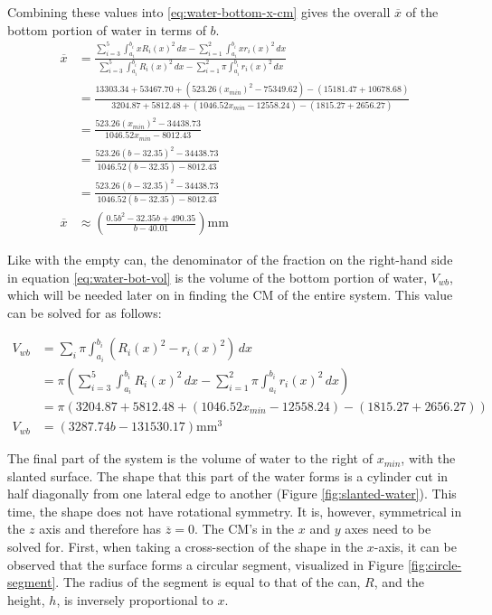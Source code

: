 \documentclass[11pt]{article}
\begin{document}
    Combining these values into \eqref{eq:water-bottom-x-cm} gives the overall $\overline{x}$ of the bottom portion of water in terms of $b$.
    {\footnotesize\begin{align*}
        \overline{x} &= \frac{\sum_{i=3}^5 \int_{a_i}^{b_i} x R_i(x)^2 \, dx - \sum_{i=1}^2 \int_{a_i}^{b_i} x r_i(x)^2 \, dx}{\sum_{i=3}^5 \int_{a_i}^{b_i} R_i(x)^2 \, dx - \sum_{i=1}^2 \pi \int_{a_i}^{b_i} r_i(x)^2 \, dx} \\
        &= \frac{13303.34 + 53467.70 + (523.26 (x_{min})^2 - 75349.62) - (15181.47 + 10678.68)}{3204.87 + 5812.48 + (1046.52x_{min} - 12558.24) - (1815.27 + 2656.27)} \\
        &= \frac{523.26 (x_{min})^2 - 34438.73}{1046.52x_{min} - 8012.43} \\
        &= \frac{523.26 (b - 32.35)^2 - 34438.73}{1046.52(b - 32.35) - 8012.43} \\
        &= \frac{523.26 (b - 32.35)^2 - 34438.73}{1046.52(b - 32.35) - 8012.43} \\
        \overline{x} &\approx \left( \frac{0.5b^2 - 32.35b + 490.35}{b - 40.01} \right) \mathrm{mm}
    \end{align*}}

    Like with the empty can, the denominator of the fraction on the right-hand side in equation \eqref{eq:water-bot-vol} is the volume of the bottom portion of water, $V_{wb}$, which will be needed later on in finding the CM of the entire system. This value can be solved for as follows:

    {\footnotesize\begin{align*}
        V_{wb} &= \sum_i \pi \int_{a_i}^{b_i} \left( R_i(x)^2 - r_i(x)^2 \right) \, dx \\
        &= \pi \left( \sum_{i=3}^5 \int_{a_i}^{b_i} R_i(x)^2 \, dx - \sum_{i=1}^2 \pi \int_{a_i}^{b_i} r_i(x)^2 \, dx \right) \\
        &= \pi \left( 3204.87 + 5812.48 + (1046.52x_{min} - 12558.24) - (1815.27 + 2656.27) \right) \\
        V_{wb} &= (3287.74b - 131530.17) \mathrm{mm}^3
    \end{align*}}

    The final part of the system is the volume of water to the right of $x_{min}$, with the slanted surface. The shape that this part of the water forms is a cylinder cut in half diagonally from one lateral edge to another (Figure \ref{fig:slanted-water}). This time, the shape does not have rotational symmetry. It is, however, symmetrical in the $z$ axis and therefore has $\overline{z} = 0$. The CM's in the $x$ and $y$ axes need to be solved for. First, when taking a cross-section of the shape in the $x$-axis, it can be observed that the surface forms a circular segment, visualized in Figure \ref{fig:circle-segment}. The radius of the segment is equal to that of the can, $R$, and the height, $h$, is inversely proportional to $x$.
\end{document}

